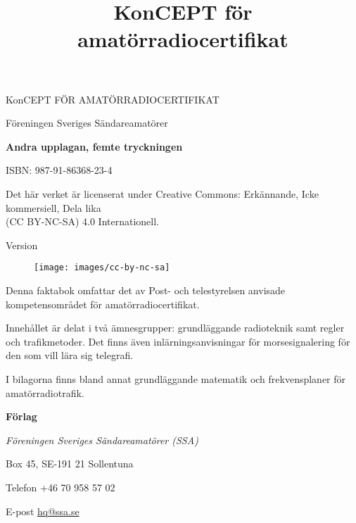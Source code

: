 \onecolumn{}
\vspace{10em}
\title{KonCEPT för amatörradiocertifikat}
\begin{center}
\Large{KonCEPT FÖR AMATÖRRADIOCERTIFIKAT}

Föreningen Sveriges Sändareamatörer\\[2\baselineskip]
\end{center}

\noindent \textbf{Andra upplagan, femte tryckningen}

\noindent ISBN: 987-91-86368-23-4

\noindent
\medskip
\noindent Det här verket är licenserat under Creative Commons:\newline
\noindent Erkännande, Icke kommersiell, Dela lika\\
\noindent (CC BY-NC-SA) 4.0 Internationell.\\
\bigskip

\noindent Version \revision

\begin{figure}[h]
    \texttt{[image: images/cc-by-nc-sa]}
\end{figure}


\vfill

\noindent Denna faktabok omfattar det av Post- och tele\-styrel\-sen anvisade
kompetensområdet för amatörradiocertifikat.

\bigskip

\noindent Innehållet är delat i två ämnesgrupper: grundläggande radioteknik samt regler och tra\-fik\-metoder.
Det finns även inlärningsanvisningar för morsesignalering för den
som vill lära sig telegrafi.

\bigskip

\noindent I bilagorna finns bland annat grundläggande matematik
och frekvensplaner för ama\-törradiotrafik. 

\vfill

\noindent \textbf{Förlag}

\smallskip

\noindent\textit{Föreningen Sveriges Sändareamatörer (SSA)}

\smallskip\noindent Box 45, SE-191 21 Sollentuna

\smallskip

\noindent Telefon +46 70 958 57 02


\smallskip\noindent E-post \href{mailto:hq@ssa.se}{hq@ssa.se}


\restoregeometry\twocolumn
{}
